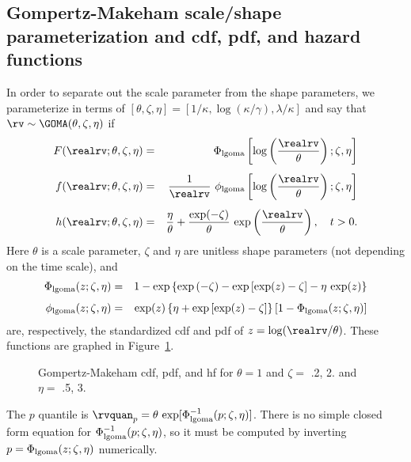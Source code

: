 \subsection{Gompertz-Makeham scale/shape parameterization and
cdf, pdf, and hazard functions} 

In order to separate out the scale parameter from the shape parameters,
we parameterize in terms of $[\theta,\zeta,
\eta]=[1/\kappa,\log(\kappa/\gamma),\lambda/\kappa]$ and say that
$\rv \sim \GOMA(\theta,\zeta, \eta)$ if
\begin{eqnarray*}  
 F(\realrv;\theta,\zeta, \eta)&=&
\Phi_{\rm lgoma} \left [\log \left ( \frac{\realrv}{\theta} \right ) ; \zeta, \eta \right ]
\\[1ex]
 f(\realrv;\theta,\zeta, \eta)&=&
		\frac{1}{\realrv}
        \,\,
\phi_{\rm lgoma}   
\left [\log  \left ( \frac{\realrv}{\theta} \right ); \zeta, \eta \right ]
\\[1ex]
 h(\realrv;\theta,\zeta, \eta)&=&
 \frac{\eta}{\theta}+
 \frac{\exp(-\zeta)}{\theta}
 \,
 \exp 
	\left (
	\frac{\realrv}{\theta}
	\right ) , \quad t > 0.
 \end{eqnarray*}
Here
$\theta$ is a scale parameter, $\zeta$ and $\eta$ are
unitless shape parameters (not depending on the time scale), and
\begin{eqnarray*}  
 \Phi_{\rm lgoma}(z; \zeta, \eta)&=& 1- \exp \left \{ \exp \left
(-\zeta \right ) - \exp \left [ \exp(z) 	-\zeta \right ] -\eta
\,
\exp(z)
\right \}
\\[1ex]
 \phi_{\rm lgoma}(z;\zeta, \eta)&=& \exp(z) \left \{ \eta + \exp \left
[\exp(z) 		-\zeta \right] \right \} \left [
1-\Phi_{\rm lgoma}(z;\zeta, \eta)\right]  
\end{eqnarray*}  
are, respectively, the standardized cdf and pdf of
$z=\log(\realrv/\theta)$.  These functions are graphed in
Figure~\ref{figure:distplot.goma.ps}.
\begin{figure}
\caption{Gompertz-Makeham cdf, pdf, and hf 
for $\theta=1$ and $\zeta=$ .2, 2. and $\eta=$ .5, 3.}
\label{figure:distplot.goma.ps}
\end{figure}
The $p$ quantile is $\rvquan_{p}=\theta \, \exp[\Phi^{-1}_{\rm
lgoma}(p;\zeta, \eta)]$.  There is no simple closed form equation for
$\Phi^{-1}_{\rm lgoma}(p;\zeta, \eta)$, so it must be computed by inverting
$p=\Phi_{\rm lgoma}(z;\zeta, \eta)$ numerically.


